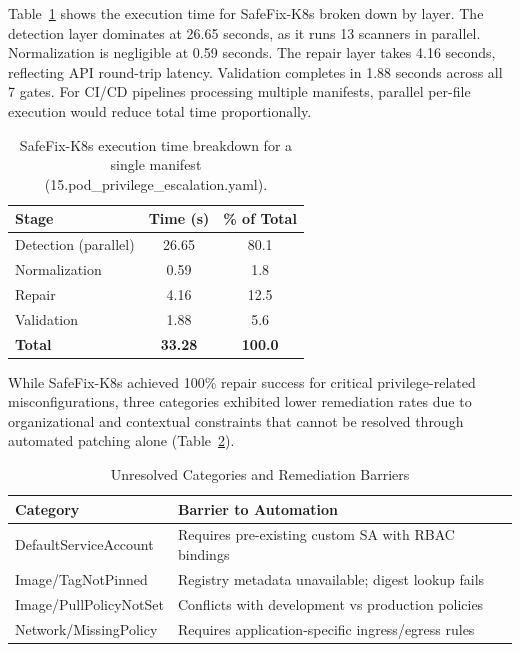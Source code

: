 \documentclass[preprint,12pt]{elsarticle}
\newcommand{\new}[1]{#1}
\newcommand{\safefixtablestyle}{%
  \small
  \setlength{\tabcolsep}{5pt}
  \renewcommand{\arraystretch}{1.15}
}
\begin{document}
\new{
Table~\ref{tab:safefix-timing} shows the execution time for 
SafeFix-K8s broken down by layer. The detection layer dominates at 26.65 
seconds, as it runs 13 scanners in parallel. Normalization is negligible 
at 0.59 seconds. The repair layer takes 4.16 seconds, reflecting 
API round-trip latency. Validation completes in 1.88 seconds across all 
7 gates. For CI/CD pipelines processing multiple manifests, parallel 
per-file execution would reduce total time proportionally. }

\new{
\begin{table}[htbp]
\centering
\caption{SafeFix-K8s execution time breakdown for a single manifest (15.pod\_privilege\_escalation.yaml).}
\label{tab:safefix-timing}
\safefixtablestyle
\begin{tabular}{@{} l c c @{}}
\toprule
\textbf{Stage} & \textbf{Time (s)} & \textbf{\% of Total} \\
\midrule
Detection (parallel) & 26.65 & 80.1 \\
Normalization                  &  0.59 &  1.8 \\
Repair                    &  4.16 & 12.5 \\
Validation                     &  1.88 &  5.6 \\
\midrule
\textbf{Total}                 & \textbf{33.28} & \textbf{100.0} \\
\bottomrule
\end{tabular}
\end{table}
}


While SafeFix-K8s achieved 100\% repair success for critical privilege-related 
misconfigurations, three categories exhibited lower remediation rates due to 
organizational and contextual constraints that cannot be resolved through 
automated patching alone (Table~\ref{tab:unresolved_categories}).

\begin{table}[htbp]
\centering
\caption{\new{Unresolved Categories and Remediation Barriers}}
\label{tab:unresolved_categories}
\small
\begin{tabular}{@{}lp{6.5cm}@{}}
\toprule
\textbf{Category}  & \textbf{Barrier to Automation} \\
\midrule
DefaultServiceAccount  & Requires pre-existing custom SA with RBAC bindings \\
Image/TagNotPinned  & Registry metadata unavailable; digest lookup fails \\
Image/PullPolicyNotSet  & Conflicts with development vs production policies \\
Network/MissingPolicy  & Requires application-specific ingress/egress rules \\
\bottomrule
\end{tabular}
\end{table}
\end{document}
